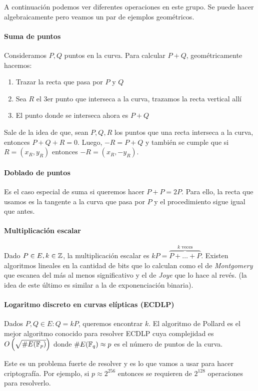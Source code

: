   A continuación podemos ver diferentes operaciones en este grupo.
  Se puede hacer algebraicamente pero veamos un par de ejemplos geométricos.

  \paragraph{Suma de puntos}
  Consideramos $P, Q$ puntos en la curva. Para calcular $P+Q$, geométricamente hacemos:
  \begin{enumerate}
    \item Trazar la recta que pasa por $P$ y $Q$ 
    \item Sea $R$ el 3er punto que interseca a la curva, trazamos la recta vertical allí 
    \item El punto donde se interseca ahora es $P + Q$
  \end{enumerate}
  \begin{remark}
    Sale de la idea de que, sean $P, Q, R$ los puntos que una recta interseca a la curva, 
    entonces $P+Q+R = 0$.
    Luego, $-R = P+Q$ y también se cumple que si $R = (x_R, y_R)$ entonces $-R = (x_R, -y_R)$.
  \end{remark}

  \paragraph{Doblado de puntos}
  Es el caso especial de suma si queremos hacer $P+P = 2P$.
  Para ello, la recta que usamos es la tangente a la curva que pasa por $P$ y el 
  procedimiento sigue igual que antes.

  \paragraph{Multiplicación escalar}
  Dado $P\in E, k\in \mathbb{Z}$, la multiplicación escalar es $kP = \overbrace{P + \dots + P}^{k\text{ veces}}$.
  Existen algoritmos lineales en la cantidad de bits que lo calculan como el de \textit{Montgomery} 
  que escanea del más al menos significativo y el de \textit{Joye} que lo hace al revés.
  (la idea de este último es similar a la de exponenciación binaria).

  \paragraph{Logaritmo discreto en curvas elípticas (ECDLP)}
  Dados $P, Q \in E : Q = kP$, queremos encontrar $k$.
  El algoritmo de Pollard es el mejor algoritmo conocido para resolver ECDLP cuya 
  complejidad es $O\left(\sqrt{\# E(\mathbb{F}_p)}\right)$ donde $\# E(\mathbb{F}_q) \approx p$ es el 
  número de puntos de la curva.
  \begin{remark}
    Este es un problema fuerte de resolver y es lo que vamos a usar para hacer 
    criptografía.
    Por ejemplo, si $p\approx 2^{256}$ entonces se requieren de $2^{128}$ operaciones para 
    resolverlo.
  \end{remark}

